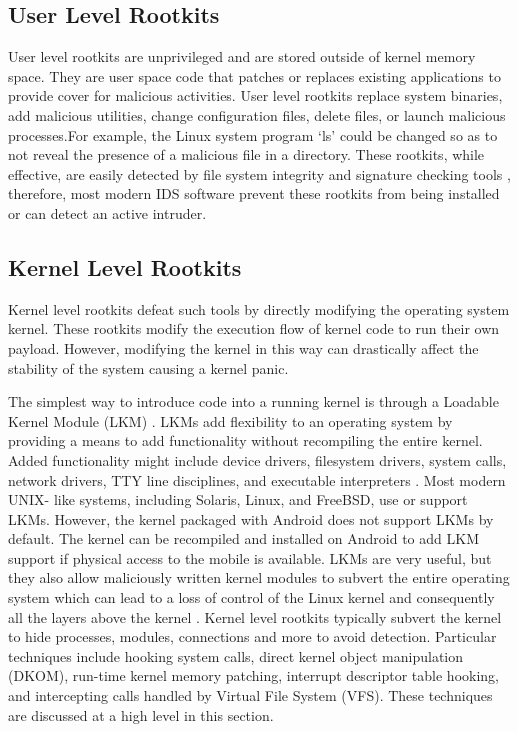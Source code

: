 \subsection{User Level Rootkits}

User level rootkits are unprivileged and are stored outside of kernel memory
 space. They are user space code that patches or replaces existing applications to provide
 cover for malicious activities. User level rootkits replace system binaries, add malicious
 utilities, change configuration files, delete files, or launch malicious processes.For example, the Linux system program ‘ls’ could be changed so as to not reveal the
 presence of a malicious file in a directory. These rootkits, while effective, are easily
 detected by file system integrity and signature checking tools , therefore, most
 modern IDS software prevent these rootkits from being installed or can detect an active
 intruder.

\subsection{Kernel Level Rootkits}
Kernel level rootkits defeat such tools by directly modifying the operating system
 kernel. These rootkits modify the execution flow of kernel code to run their own payload.
 However, modifying the kernel in this way can drastically affect the stability of the
 system causing a kernel panic.

The simplest way to introduce code into a running kernel is through a Loadable
 Kernel Module (LKM) . LKMs add flexibility to an operating system by
 providing a means to add functionality without recompiling the entire kernel. Added
 functionality might include device drivers, filesystem drivers, system calls, network
 drivers, TTY line disciplines, and executable interpreters . Most modern UNIX-
like systems, including Solaris, Linux, and FreeBSD, use or support LKMs.
However, the kernel packaged with Android does not support LKMs by default. The
 kernel can be recompiled and installed on Android to add LKM support if physical access
 to the mobile is available. LKMs are very useful, but they also allow maliciously written
 kernel modules to subvert the entire operating system which can lead to a loss of control
 of the Linux kernel and consequently all the layers above the kernel . Kernel level
 rootkits typically subvert the kernel to hide processes, modules, connections and more to
 avoid detection. Particular techniques include hooking system calls, direct kernel object
 manipulation (DKOM), run-time kernel memory patching, interrupt descriptor table
 hooking, and intercepting calls handled by Virtual File System (VFS). These techniques
 are discussed at a high level in this section.


